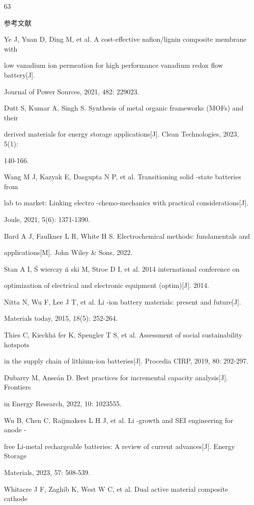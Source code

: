 63\par
参考文献\par
[1] Ye J, Yuan D, Ding M, et al. A cost-effective nafion/lignin composite membrane with\par
low vanadium ion permeation for high performance vanadium redox flow battery[J].\par
Journal of Power Sources, 2021, 482: 229023.\par
[2] Dutt S, Kumar A, Singh S. Synthesis of metal organic frameworks (MOFs) and their\par
derived materials for energy storage applications[J]. Clean Technologies, 2023, 5(1):\par
140-166.\par
[3] Wang M J, Kazyak E, Dasgupta N P, et al. Transitioning solid -state batteries from\par
lab to market: Linking electro -chemo-mechanics with practical considerations[J].\par
Joule, 2021, 5(6): 1371-1390.\par
[4] Bard A J, Faulkner L R, White H S. Electrochemical methods: fundamentals and\par
applications[M]. John Wiley \& Sons, 2022.\par
[5] Stan A I, Ś wierczy ń ski M, Stroe D I, et al. 2014 international conference on\par
optimization of electrical and electronic equipment (optim)[J]. 2014.\par
[6] Nitta N, Wu F, Lee J T, et al. Li -ion battery materials: present and future[J].\par
Materials today, 2015, 18(5): 252-264.\par
[7] Thies C, Kieckhä fer K, Spengler T S, et al. Assessment of social sustainability hotspots\par
in the supply chain of lithium-ion batteries[J]. Procedia CIRP, 2019, 80: 292-297.\par
[8] Dubarry M, Anseán D. Best practices for incremental capacity analysis[J]. Frontiers\par
in Energy Research, 2022, 10: 1023555.\par
[9] Wu B, Chen C, Raijmakers L H J, et al. Li -growth and SEI engineering for anode -\par
free Li-metal rechargeable batteries: A review of current advances[J]. Energy Storage\par
Materials, 2023, 57: 508-539.\par
[10] Whitacre J F, Zaghib K, West W C, et al. Dual active material composite cathode\par
